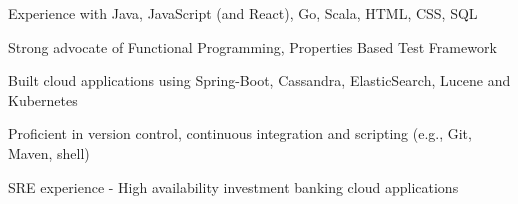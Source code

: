 \begin{cvitems}
\sectionspace
\sectionspace
\vspace{1mm}
	\fontsize{11pt}{1.4em}\bodyfontlight\upshape\color{text}
        \item {Experience with Java, JavaScript (and React), Go, Scala, HTML, CSS, SQL}
        \item {Strong advocate of Functional Programming, Properties Based Test Framework}
        \item {Built cloud applications using Spring-Boot, Cassandra, ElasticSearch, Lucene and Kubernetes}
        \item {Proficient in version control, continuous integration and scripting (e.g., Git, Maven, shell)}
        \item {SRE experience - High availability investment banking cloud applications}
        \end{cvitems}
\vspace{1mm}
\sectionspace
